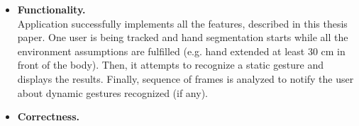 \documentclass[a4paper,11pt,oneside]{article}
\begin{document}
  \begin{itemize}
  \item \textbf{Functionality.} \\
Application successfully implements all the features, described in this thesis paper. One user is being tracked and hand segmentation starts while all the environment assumptions are fulfilled (e.g. hand extended at least 30 cm in front of the body). Then, it attempts to recognize a static gesture and displays the results. Finally, sequence of frames is analyzed to notify the user about dynamic gestures recognized (if any).

 \item \textbf{Correctness.} \\
%


\end{itemize}
\end{document}
